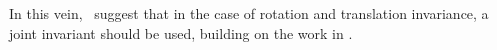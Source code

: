
  In this vein, \Bruna\ suggest that in the case of rotation and translation
  invariance, a joint invariant should be used, building on the work in
  \citep{citti_cortical_2006, boscain_anthropomorphic_2010,
  sgallari_scale_2007}. 


